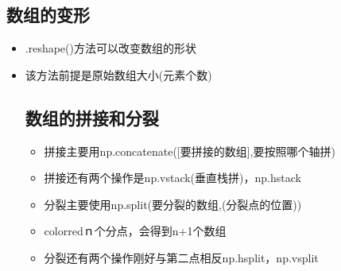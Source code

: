 \documentclass{article}
\begin{document}
\subsection{数组的变形}

\begin{itemize}
\item .reshape()方法可以改变数组的形状
\item 该方法前提是原始数组大小(元素个数)

\subsection{数组的拼接和分裂}
\begin{itemize}
\item 拼接主要用np.concatenate([要拼接的数组],要按照哪个轴拼)
\item 拼接还有两个操作是np.vstack(垂直栈拼)，np.hstack
\item 分裂主要使用np.split(要分裂的数组,(分裂点的位置))
\item {color{red}ｎ个分点，会得到n+1个数组}
\item 分裂还有两个操作刚好与第二点相反np.hsplit，np.vsplit


\end{itemize}
\end{itemize}
%
%
\end{document}
